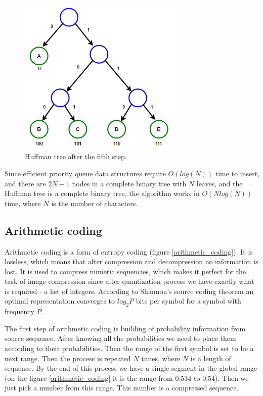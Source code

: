 \begin{figure}[!ht]
    \includegraphics[width=0.7\textwidth]{figure/huffman-5.png}
    \caption{Huffman tree after the fifth step.}
    \label{huffman-5}
\end{figure}

Since efficient priority queue data structures require $O(log(N))$ time to insert, and there are $2N-1$ nodes in a complete binary tree with $N$ leaves, and the Huffman tree is a complete binary tree, the algorithm works in $O(N log(N))$ time, where $N$ is the number of characters.

\subsection{Arithmetic coding}

Arithmetic coding is a form of entropy coding (figure \ref{arithmetic_coding}). It is lossless, which means that after compression and decompression no information is lost. It is used to compress numeric sequencies, which makes it perfect for the task of image compression since after quantization process we have exactly what is required - a list of integers. According to Shannon's source coding theorem an optimal representation converges to $log_2P$ bits per symbol for a symbol with frequency $P$.

The first step of arithmetic coding is building of probability information from source sequence. After knowing all the probabilities we need to place them according to their probabilities. Then the range of the first symbol is set to be a next range. Then the process is repeated $N$ times, where $N$ is a length of sequence. By the end of this process we have a single segment in the global range (on the figure \ref{arithmetic_coding} it is the range from $0.534$ to $0.54$). Then we just pick a number from this range. This number is a compressed sequence.

